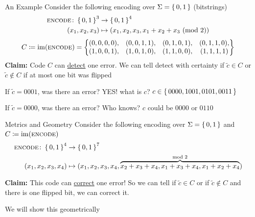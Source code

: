 \documentclass[aspectratio=169]{beamer}
\begin{document}
\begin{frame}{An Example}
    Consider the following encoding over $\Sigma = \set{0, 1}$ (bitstrings)
    \begin{align*}
        \textsc{encode}\colon \set{0, 1}^3 &\to \set{0, 1}^4 \\
                    (x_1, x_2, x_3) &\mapsto (x_1, x_2, x_3, x_1 + x_2 + x_3 \pmod{2})
    \end{align*}
    \[
        C \coloneqq \operatorname{im}(\textsc{encode}) = \begin{Bmatrix}
                (0, 0, 0, 0), & (0, 0, 1, 1), & (0, 1, 0, 1), & (0, 1, 1, 0), \\
                (1, 0, 0, 1), & (1, 0, 1, 0), & (1, 1, 0, 0), & (1, 1, 1, 1)
            \end{Bmatrix}
    \]
    \textcolor{sigma@mainblue}{\textbf{Claim:}} Code $C$ can \ul{detect} one error. 
    We can tell detect with certainty if $\tilde{c} \in C$ or $\tilde{c} \notin C$ if at most one bit was flipped \pause

    If $\tilde{c} =  0001$, was there an error? \pause \textcolor{sigma@mainblue}{YES!} what is $c$? \pause $c \in \set{0000, 1001, 0101, 0011}$ \pause
    
    If $\tilde{c} =  0000$, was there an error? \pause \textcolor{sigma@mainblue}{Who knows?} $c$ could be $0000$ or $0110$
\end{frame}

\begin{frame}{Metrics and Geometry}
        Consider the following encoding over $\Sigma = \set{0, 1}$ and  $C \coloneqq \operatorname{im}(\textsc{encode})$
    \begin{align*}
        \textsc{encode}\colon \set{0, 1}^4 &\to \set{0, 1}^7 \\
                    (x_1, x_2, x_3, x_4) &\mapsto (x_1, x_2, x_3, x_4, \overbrace{x_2 + x_3 + x_4, x_1 + x_3 + x_4, x_1 + x_2 + x_4}^{\text{mod }2})
    \end{align*}

    \textcolor{sigma@mainblue}{\textbf{Claim:}} This code can \ul{correct} one error! 
    So we can tell if $\tilde{c} \in C$ or if $\tilde{c} \notin C$ and there is one flipped bit, we can correct it. \pause

    We will show this geometrically
\end{frame}
\end{document}
